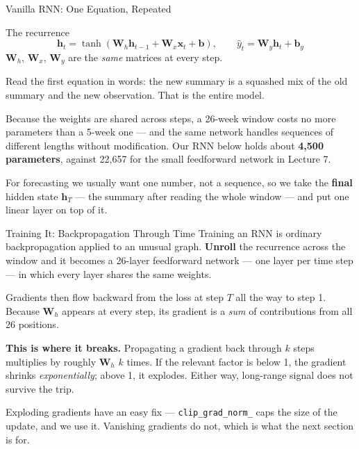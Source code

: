 \documentclass[aspectratio=169, 11pt]{beamer}
\begin{document}
\begin{frame}{Vanilla RNN: One Equation, Repeated}
  \begin{definitionbox}{The recurrence}
    \[
      \mathbf{h}_t = \tanh\!\left(\mathbf{W}_h \mathbf{h}_{t-1} + \mathbf{W}_x \mathbf{x}_t + \mathbf{b}\right),
      \qquad
      \hat{y}_t = \mathbf{W}_y \mathbf{h}_t + \mathbf{b}_y
    \]
    $\mathbf{W}_h$, $\mathbf{W}_x$, $\mathbf{W}_y$ are the \emph{same} matrices at every step.
  \end{definitionbox}

  Read the first equation in words: the new summary is a squashed mix of the old summary and the
  new observation. That is the entire model.

  \vspace{0.15cm}
  Because the weights are shared across steps, a 26-week window costs no more parameters than a
  5-week one --- and the same network handles sequences of different lengths without modification.
  Our RNN below holds about \textbf{4{,}500 parameters}, against 22{,}657 for the small
  feedforward network in Lecture 7.

  \vspace{0.1cm}
  For forecasting we usually want one number, not a sequence, so we take the \textbf{final}
  hidden state $\mathbf{h}_T$ --- the summary after reading the whole window --- and put one
  linear layer on top of it.
\end{frame}

\begin{frame}{Training It: Backpropagation Through Time}
  Training an RNN is ordinary backpropagation applied to an unusual graph. \textbf{Unroll} the
  recurrence across the window and it becomes a 26-layer feedforward network --- one layer per
  time step --- in which every layer shares the same weights.

  \vspace{0.15cm}
  Gradients then flow backward from the loss at step $T$ all the way to step 1. Because
  $\mathbf{W}_h$ appears at every step, its gradient is a \emph{sum} of contributions from all 26
  positions.

  \begin{warningbox}
    \textbf{This is where it breaks.} Propagating a gradient back through $k$ steps multiplies by
    roughly $\mathbf{W}_h$ $k$ times. If the relevant factor is below 1, the gradient shrinks
    \emph{exponentially}; above 1, it explodes. Either way, long-range signal does not survive
    the trip.
  \end{warningbox}

  \vspace{0.1cm}
  Exploding gradients have an easy fix --- \texttt{clip\_grad\_norm\_} caps the size of the
  update, and we use it. Vanishing gradients do not, which is what the next section is for.
\end{frame}
\end{document}
